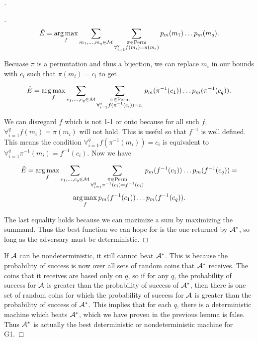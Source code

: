 \begin{proof}[]
\begin{proof}[]
$$\hat{E}=\operatorname*{arg\,max}_f \sum_{m_1, \ldots,m_q\in {\cal M} }\sum_{\substack{\pi\in\mathrm{Perm} \\ \forall_{i=1}^q f(m_i)=\pi(m_i)}} p_m(m_1)\ldots p_m(m_q).$$

Becuase $\pi$ is a permutation and thus a bijection, we can replace $m_i$ in our bounds with $c_i$ such that $\pi(m_i)=c_i$ to get 

$$\hat{E}=\operatorname*{arg\,max}_f \sum_{c_1, \ldots,c_q\in {\cal M} }\sum_{\substack{\pi\in\mathrm{Perm} \\\forall_{i=1}^q f(\pi^{-1}(c_i))=c_i}} p_m(\pi^{-1}(c_1))\ldots p_m(\pi^{-1}(c_q)).$$

We can disregard $f$ which is not 1-1 or onto because for all such $f$,  $\forall_{i=1}^q f(m_i)=\pi(m_i)$ will not hold. This is useful so that $f^{-1}$ is well defined. This means the condition $\forall_{i=1}^q f(\pi^{-1}(m_i))=c_i$ is equivalent to $\forall_{i=1}^q \pi^{-1}(m_i)=f^{-1}(c_i)$. Now we have

$$\hat{E}=\operatorname*{arg\,max}_f \sum_{c_1, \ldots,c_q\in {\cal M} }\sum_{\substack{\pi\in\mathrm{Perm} \\\forall_{i=1}^q \pi^{-1}(c_i)=f^{-1}(c_i)}} p_m(f^{-1}(c_1))\ldots p_m(f^{-1}(c_q))=$$
$$\operatorname*{arg\,max}_f p_m(f^{-1}(c_1))\ldots p_m(f^{-1}(c_q)).$$

The last equality holds because we can mazimize a sum by maximizing the summand. Thus the best function we can hope for is the one returned by ${\mathcal A}^*$, so long as the adversary must be deterministic. \qedsym
\end{proof}


If ${\mathcal A}$ can be nondeterministic, it still cannot beat ${\mathcal A}^*$. This is because the probability of success is now over all sets of random coins that ${\mathcal A}^*$ receives. The coins that it receives are based only on $q$, so if for any $q$, the probability of success for ${\mathcal A}$ is greater than the probability of success of ${\mathcal A}^*$, then there is one set of random coins for which the probability of success for ${\mathcal A}$ is greater than the probability of success of ${\mathcal A}^*$. This implies that for each $q$, there is a deterministic machine which beats ${\mathcal A}^*$, which we have proven in the previous lemma is false.  Thus ${\mathcal A}^*$ is actually the best deterministic or nondeterministic machine for G1.


\end{proof}
